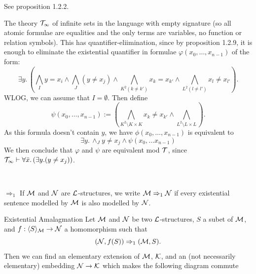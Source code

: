 \documentclass{article}
\numberwithin{thm}{subsection}
\begin{document}
\proof See proposition 1.2.2.
\begin{ex}
    The theory $\mathcal{T}_{\infty}$ of infinite sets in the language with empty signature (so all atomic formulae are equalities and the only terms are variables, no function or relation symbols). This has quantifier-eliimination, since by proposition 1.2.9, it is enough to eliminate the existential quantifier in formulae $\varphi(x_{0}, \dots, x_{n-1})$ of the form: \[ \exists y.\,\left(\bigwedge_{I}y=x_{i} \wedge \bigwedge_{J}(y \neq x_{j}) \wedge \bigwedge_{K^{2} (k \neq k')} x_{k} = x_{k'} \wedge \bigwedge_{L^2 (l \neq l')} x_{l} \neq x_{l'}\right). \] WLOG, we can assume that $I=\emptyset$. Then define \[ \psi(x_{0},\dots, x_{n-1}) := \left(\bigwedge_{K^{2} \setminus K \times K} x_{k} \neq x_{k'} \wedge \bigwedge_{L^{2} \setminus L \times L}\right).\] As this formula doesn't contain $y$, we have $\phi(x_{0}, \dots, x_{n-1})$ is equivalent to \[\exists y. \, \wedge_{J} y \neq x_{j} \wedge \psi(x_{0},\dots x_{n-1}) \] We then conclude that $\varphi$ and $\psi$ are equivalent mod $\mathcal{T}$, since $\mathcal{T}_{\infty} \vdash \forall \bar x. \, (\exists y. (y \neq x_{j}))$.
\end{ex}
\hspace{0.1cm}\\
\newlec \begin{fancydefine*}{$\Rightarrow_{1}$} If $\mathcal{M}$ and $\mathcal{N}$ are $\mathcal{L}$-structures, we write $\mathcal{M} \Rightarrow_{1} \mathcal{N}$ if every existential sentence modelled by $\mathcal{M}$ is also modelled by $\mathcal{N}$.
\end{fancydefine*}
\begin{fancythm}{Existential Amalagmation} Let $\mathcal{M}$ and $\mathcal{N}$ be two $\mathcal{L}$-structures, $S$ a subet of $\mathcal{M}$, and $f: \langle S \rangle_{\mathcal{M}} \to \mathcal{N}$ a homomorphism such that \[ (\mathcal{N},f(S)) \Rightarrow_{1} (\mathcal{M},S).\] Then we can find an elementary extension of $\mathcal{M}$, $\mathcal{K}$, and an (not necessarily elementary) embedding $\mathcal{N} \to \mathcal{K}$ which makes the following diagram commute \begin{center}
\end{center} 
\end{fancythm}
\end{document}
